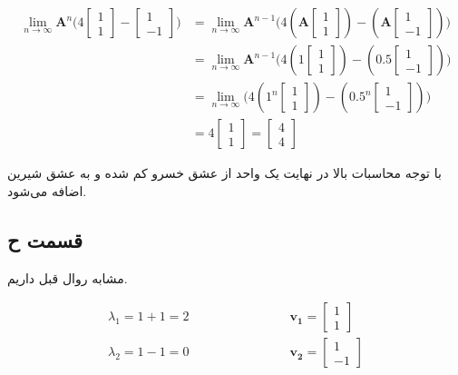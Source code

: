 \documentclass[14pt,a4]{article}
\begin{document}
\begin{align*}
    \lim_{n \to \infty} \boldsymbol{A}^n\Big(4 \begin{bmatrix}1 \\ 1\end{bmatrix} - \begin{bmatrix}1\\ -1\end{bmatrix}\Big) & =
    \lim_{n \to \infty} \boldsymbol{A}^{n-1}\Big(4 (\boldsymbol{A}\begin{bmatrix}1 \\ 1\end{bmatrix}) - (\boldsymbol{A} \begin{bmatrix}1\\ -1\end{bmatrix}) \Big) \\
    & = \lim_{n \to \infty} \boldsymbol{A}^{n-1}\Big(4 (1\begin{bmatrix}1 \\ 1\end{bmatrix}) - (0.5\begin{bmatrix}1\\ -1\end{bmatrix}) \Big) \\
    & = \lim_{n \to \infty} \Big(4 (1^n\begin{bmatrix}1 \\ 1\end{bmatrix}) - (0.5^{n}\begin{bmatrix}1\\ -1\end{bmatrix}) \Big) \\
    & = 4 \begin{bmatrix}1 \\ 1\end{bmatrix} = \begin{bmatrix}4 \\ 4\end{bmatrix}
\end{align*}

با توجه محاسبات بالا در نهایت یک واحد از عشق خسرو کم شده و به عشق شیرین اضافه می‌شود.

\subsection*{قسمت ح}

مشابه روال قبل داریم.

\begin{align*}
    \lambda_1 = 1 + 1 = 2  & \hspace{3cm} \boldsymbol{v_1} = \begin{bmatrix} 1 \\ 1 \end{bmatrix}
    \\
    \lambda_2  =  1 - 1 = 0  & \hspace{3cm} \boldsymbol{v_2} = \begin{bmatrix} 1 \\ -1\end{bmatrix}
\end{align*}
\end{document}
